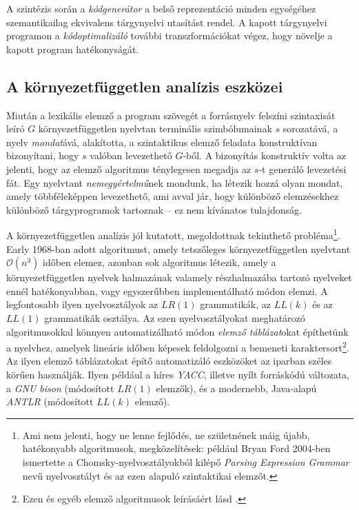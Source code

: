 A szintézis során a \textit{kódgenerátor} a belső reprezentáció minden egységéhez szemantikailag ekvivalens tárgynyelvi utasítást rendel.
A kapott tárgynyelvi programon a \textit{kódoptimalizáló} további transzformációkat végez, hogy növelje a kapott program hatékonyságát.


\subsection{A környezetfüggetlen analízis eszközei}
Miután a lexikális elemző a program szövegét a forrásnyelv felszíni szintaxisát leíró $G$ környezetfüggetlen nyelvtan terminális szimbólumainak $s$ sorozatává, a nyelv \textit{mondat}ává, alakította, a szintaktikus elemző feladata konstruktívan bizonyítani, hogy $s$ valóban levezethető $G$-ből.
A bizonyítás konstruktív volta az jelenti, hogy az elemző algoritmus ténylegesen megadja az $s$-t generáló levezetési fát.
Egy nyelvtant \textit{nemegyértelmű}nek mondunk, ha létezik hozzá olyan mondat, amely többféleképpen levezethető, ami avval jár, hogy különböző elemzésekhez különböző tárgyprogramok tartoznak -- ez nem kívánatos tulajdonság.

A környezetfüggetlen analízis jól kutatott, megoldottnak tekinthető probléma\footnote{
	Ami nem jelenti, hogy ne lenne fejlődés, ne születnének máig újabb, hatékonyabb algoritmusok, megközelítések: például Bryan Ford 2004-ben ismertette a Chomsky-nyelvosztályokból kilépő \textit{Parsing Expression Grammar} nevű nyelvosztályt és az ezen alapuló szintaktikai elemzőt\cite{Ford04PEG}.
}.
Early 1968-ban adott algoritmust, amely tetszőleges környezetfüggetlen nyelvtant $\mathcal{O}(n^3)$ időben elemez, azonban sok algoritmus létezik, amely a környezetfüggetlen nyelvek halmazának valamely részhalmazába tartozó nyelveket ennél hatékonyabban, vagy egyszerűbben implementálható módon elemzi.
A legfontosabb ilyen nyelvosztályok az $LR(1)$ grammatikák, az $LL(k)$ és az $LL(1)$ grammatikák osztálya.
Az ezen nyelvosztályokat meghatározó algoritmusokkal könnyen automatizálható módon \textit{elemző táblázat}okat építhetünk a nyelvhez, amelyek lineáris időben képesek feldolgozni a bemeneti karaktersort\footnote{%
	Ezen és egyéb elemző algoritmusok leírásáért lásd \cite[4-6.~fejezetek]{Csornyei}.
}.
Az ilyen elemző táblázatokat építő automatizáló eszközöket az iparban széles körűen használják.
Ilyen például a híres \textit{YACC}, illetve nyílt forráskódú változata, a \textit{GNU bison} (módosított $LR(1)$ elemzők), és a modernebb, Java-alapú \textit{ANTLR} (módosított $LL(k)$ elemző).

